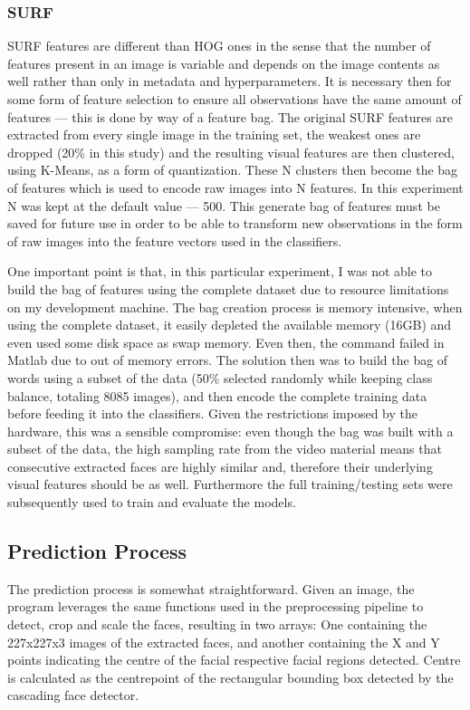 \documentclass[11pt]{article}
\begin{document}
        \subsubsection*{SURF}
            SURF features are different than HOG ones in the sense that the number of features present in an image is variable and depends on the image contents as well rather than only in metadata and hyperparameters. It is necessary then for some form of feature selection to ensure all observations have the same amount of features --- this is done by way of a feature bag. The original SURF features are extracted from every single image in the training set, the weakest ones are dropped (20\% in this study) and the resulting visual features are then clustered, using K-Means, as a form of quantization. These N clusters then become the bag of features which is used to encode raw images into N features. In this experiment N was kept at the default value --- 500. This generate bag of features must be saved for future use in order to be able to transform new observations in the form of raw images into the feature vectors used in the classifiers.

            One important point is that, in this particular experiment, I was not able to build the bag of features using the complete dataset due to resource limitations on my development machine. The bag creation process is memory intensive, when using the complete dataset, it easily depleted the available memory (16GB) and even used some disk space as swap memory. Even then, the command failed in Matlab due to out of memory errors. The solution then was to build the bag of words using a subset of the data (50\% selected randomly while keeping class balance, totaling 8085 images), and then encode the complete training data before feeding it into the classifiers. Given the restrictions imposed by the hardware, this was a sensible compromise: even though the bag was built with a subset of the data, the high sampling rate from the video material means that consecutive extracted faces are highly similar and, therefore their underlying visual features should be as well. Furthermore the full training/testing sets were subsequently used to train and evaluate the models.

    \subsection{Prediction Process}
        The prediction process is somewhat straightforward. Given an image, the program leverages the same functions used in the preprocessing pipeline to detect, crop and scale the faces, resulting in two arrays: One containing the 227x227x3 images of the extracted faces, and another containing the X and Y points indicating the centre of the facial respective facial regions detected. Centre is calculated as the centrepoint of the rectangular bounding box detected by the cascading face detector.
\end{document}
